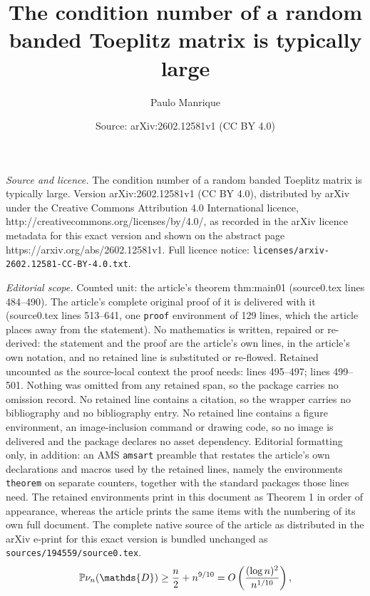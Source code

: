 \documentclass[10pt,a4paper]{amsart}
\title{The condition number of a random banded Toeplitz matrix is typically large}
\author{Paulo Manrique}
\date{Source: arXiv:2602.12581v1 (CC BY 4.0)}
\newcommand{\PP}[1]{\left(#1\right)}
\renewcommand{\Pr}{\mathbb{P}}
\begin{document}
\maketitle

\noindent\emph{Source and licence.} The condition number of a random banded Toeplitz matrix is typically large. Version arXiv:2602.12581v1 (CC BY 4.0), distributed by arXiv under the Creative Commons Attribution 4.0 International licence, http://creativecommons.org/licenses/by/4.0/, as recorded in the arXiv licence metadata for this exact version and shown on the abstract page https://arxiv.org/abs/2602.12581v1. Full licence notice: \texttt{licenses/arxiv-2602.12581-CC-BY-4.0.txt}.\par\smallskip

\noindent\textit{Editorial scope.} Counted unit: the article's theorem thm:main01 (source0.tex lines 484--490). The article's complete original proof of it is delivered with it (source0.tex lines 513--641, one \texttt{proof} environment of 129 lines, which the article places away from the statement). No mathematics is written, repaired or re-derived: the statement and the proof are the article's own lines, in the article's own notation, and no retained line is substituted or re-flowed.  Retained uncounted as the source-local context the proof needs: lines 495--497; lines 499--501.  Nothing was omitted from any retained span, so the package carries no omission record.  No retained line contains a citation, so the wrapper carries no bibliography and no bibliography entry.  No retained line contains a figure environment, an image-inclusion command or drawing code, so no image is delivered and the package declares no asset dependency.  Editorial formatting only, in addition: an AMS \texttt{amsart} preamble that restates the article's own declarations and macros used by the retained lines, namely the environments \texttt{theorem} on separate counters, together with the standard packages those lines need.  The retained environments print in this document as Theorem 1 in order of appearance, whereas the article prints the same items with the numbering of its own full document.  The complete native source of the article as distributed in the arXiv e-print for this exact version is bundled unchanged as \texttt{sources/194559/source0.tex}.
\begin{equation}\label{eqn:upperbound}
\Pr{\nu_n(\mathds{D}) \geq \frac{n}{2}+n^{9/10}} = \textnormal{O}\PP{ \frac{(\log n)^2}{n^{1/10}} },
\end{equation}
\end{document}
